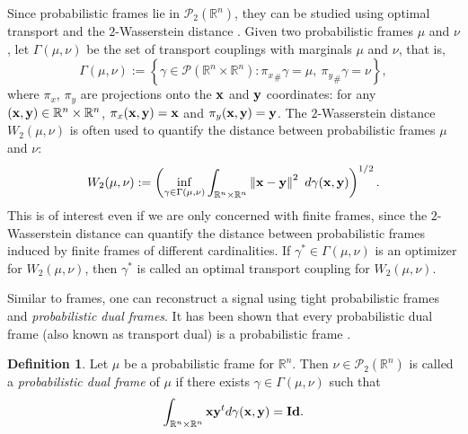\documentclass{amsart}
\numberwithin{equation}{section}
\theoremstyle{plain}
\theoremstyle{definition}
\newtheorem{definition}[theorem]{Definition}
\begin{document}
Since probabilistic frames lie in $\mathcal{P}_2(\mathbb{R}^n)$, they can be studied using optimal transport and the $2$-Wasserstein distance \cite{ehler2013probabilistic, wickman2014optimal}. Given two probabilistic frames $\mu$ and $\nu$, let $\Gamma(\mu,\nu)$ be the set of transport couplings with marginals $\mu$ and $\nu$, that is,
$$ \Gamma(\mu,\nu) :=  \left \{ \gamma \in \mathcal{P}(\mathbb{R}^n \times \mathbb{R}^n): {\pi_{{ x}}}_{\#} \gamma = \mu, \ {\pi_{{ y}}}_{\#} \gamma = \nu \right \},$$
where $\pi_{{ x}}$, $\pi_{{ y}}$ are projections onto the ${\bf x}$ and ${\bf y}$ coordinates: for any $({\bf x},{\bf y}) \in \mathbb{R}^n \times \mathbb{R}^n $, $\pi_{{ x}}({\bf x}, {\bf y}) = {\bf x}$ and $ \pi_{{ y}}({\bf x},{\bf y}) = {\bf y}$. The $2$-Wasserstein distance $ W_2(\mu,\nu)$ is often used to quantify the distance between probabilistic frames $\mu$ and $\nu$:  
$$ W_2(\mu,\nu) := \left (\underset{\gamma \in \Gamma(\mu,\nu)}{\inf}  \int_{\mathbb{R}^n \times \mathbb{R}^n}  \left \Vert {\bf x}-{\bf y}\right \Vert^2 \ d\gamma({\bf x},{\bf y}) \right)^{1/2}.$$
This is of interest even if we are only concerned with finite frames, since the $2$-Wasserstein distance can quantify the distance between probabilistic frames induced by finite frames of different cardinalities. If $\gamma^* \in \Gamma(\mu, \nu)$ is an optimizer for $ W_2(\mu,\nu)$, then $\gamma^*$ is called an optimal transport coupling for $ W_2(\mu,\nu)$.


Similar to frames, one can reconstruct a signal using tight probabilistic frames and \textit{probabilistic dual frames}. It has been shown that every probabilistic dual frame (also known as transport dual) is a probabilistic frame \cite{wickman2014optimal, wickman2017duality}.

\begin{definition}
Let $\mu$ be a probabilistic frame for $\mathbb{R}^n$. Then $\nu \in \mathcal{P}_2(\mathbb{R}^n)$ is called a \textit{probabilistic dual frame} of $\mu$ if there exists $\gamma \in \Gamma(\mu, \nu)$ such that
\begin{equation*}
  \int_{\mathbb{R}^n \times \mathbb{R}^n} {\bf x}{\bf y}^t d\gamma({\bf x}, {\bf y}) = {\bf Id}.
\end{equation*}
\end{definition}
\end{document}
